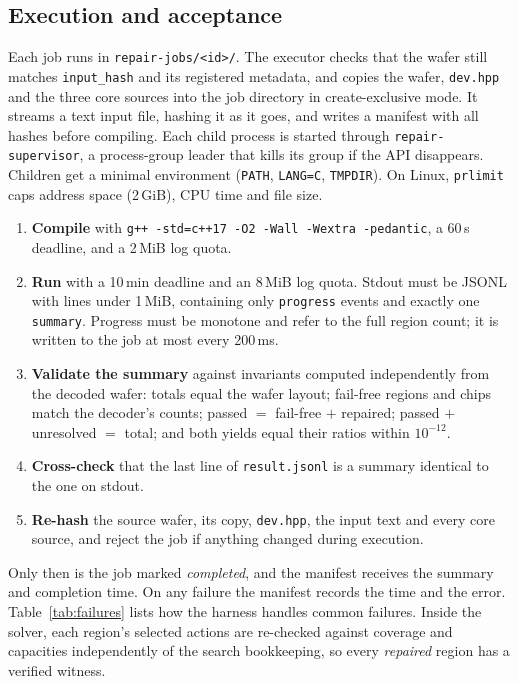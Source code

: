 \documentclass[conference]{IEEEtran}
\newcommand{\code}[1]{\texttt{\small #1}}
\begin{document}
\subsection{Execution and acceptance}
Each job runs in \code{repair-jobs/<id>/}. The executor checks that the
wafer still matches \code{input\_hash} and its registered metadata, and copies
the wafer, \code{dev.hpp} and the three core sources into the job directory
in create-exclusive mode. It streams a text input file, hashing it as it
goes, and writes a manifest with all hashes before compiling. Each child
process is started through \code{repair-supervisor}, a process-group leader
that kills its group if the API disappears. Children get a minimal
environment (\code{PATH}, \code{LANG=C}, \code{TMPDIR}). On Linux,
\code{prlimit} caps address space (2\,GiB), CPU time and file size.
\begin{enumerate}
\item \textbf{Compile} with \code{g++ -std=c++17 -O2 -Wall -Wextra
-pedantic}, a 60\,s deadline, and a 2\,MiB log quota.
\item \textbf{Run} with a 10\,min deadline and an 8\,MiB log quota. Stdout
must be JSONL with lines under 1\,MiB, containing only \code{progress}
events and exactly one \code{summary}. Progress must be monotone and refer
to the full region count; it is written to the job at most every 200\,ms.
\item \textbf{Validate the summary} against invariants computed
independently from the decoded wafer: totals equal the wafer layout;
fail-free regions and chips match the decoder's counts; passed $=$
fail-free $+$ repaired; passed $+$ unresolved $=$ total; and both yields
equal their ratios within $10^{-12}$.
\item \textbf{Cross-check} that the last line of \code{result.jsonl} is a
summary identical to the one on stdout.
\item \textbf{Re-hash} the source wafer, its copy, \code{dev.hpp}, the
input text and every core source, and reject the job if anything changed
during execution.
\end{enumerate}
Only then is the job marked \emph{completed}, and the manifest receives the
summary and completion time. On any failure the manifest records the time and
the error. Table~\ref{tab:failures} lists how the harness handles common
failures. Inside the solver, each region's selected actions are re-checked
against coverage and capacities independently of the search bookkeeping,
so every \emph{repaired} region has a verified witness.
\end{document}
